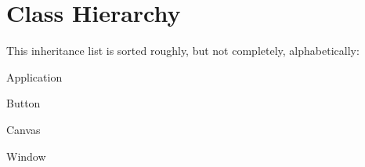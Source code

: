 \section{Class Hierarchy}
This inheritance list is sorted roughly, but not completely, alphabetically\+:\begin{DoxyCompactList}
\item Application\begin{DoxyCompactList}
\item {}
\end{DoxyCompactList}
\item Button\begin{DoxyCompactList}
\item {}
\end{DoxyCompactList}
\item Canvas\begin{DoxyCompactList}
\item {}
\end{DoxyCompactList}
\item Window\begin{DoxyCompactList}
\item {}
\end{DoxyCompactList}
\end{DoxyCompactList}
